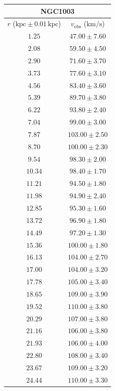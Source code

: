 \documentclass{article}
\newcommand\kpc{\textrm{kpc}}
\newcommand\kmps{\textrm{km}/\textrm{s}}
\newcommand\vobs{\ensuremath{v_{\textrm{obs}}}}
\begin{document}
\begin{table}[h!]
    \begin{tabular}{|c|c|}
        \hline
        \multicolumn{2}{|c|}{NGC1003} \\
        \hline
        $r$ ($\kpc \pm 0.01 \,\kpc$) & $\vobs$ ($\kmps$) \\
        \hline
        $1.25$ & $47.00 \pm 7.60$ \\
        $2.08$ & $59.50 \pm 4.50$ \\
        $2.90$ & $71.60 \pm 3.70$ \\
        $3.73$ & $77.60 \pm 3.10$ \\
        $4.56$ & $83.40 \pm 3.60$ \\
        $5.39$ & $89.70 \pm 3.80$ \\
        $6.22$ & $93.80 \pm 2.40$ \\
        $7.04$ & $99.00 \pm 3.00$ \\
        $7.87$ & $103.00 \pm 2.50$ \\
        $8.70$ & $100.00 \pm 2.30$ \\
        $9.54$ & $98.30 \pm 2.00$ \\
        $10.34$ & $98.40 \pm 1.70$ \\
        $11.21$ & $94.50 \pm 1.80$ \\
        $11.98$ & $94.90 \pm 2.40$ \\
        $12.85$ & $95.30 \pm 1.60$ \\
        $13.72$ & $96.90 \pm 1.80$ \\
        $14.49$ & $97.20 \pm 1.30$ \\
        $15.36$ & $100.00 \pm 1.80$ \\
        $16.13$ & $104.00 \pm 2.70$ \\
        $17.00$ & $104.00 \pm 3.20$ \\
        $17.78$ & $105.00 \pm 3.40$ \\
        $18.65$ & $109.00 \pm 3.90$ \\
        $19.52$ & $110.00 \pm 3.80$ \\
        $20.29$ & $107.00 \pm 3.80$ \\
        $21.16$ & $106.00 \pm 3.80$ \\
        $21.93$ & $106.00 \pm 4.00$ \\
        $22.80$ & $108.00 \pm 3.40$ \\
        $23.67$ & $109.00 \pm 3.20$ \\
        $24.44$ & $110.00 \pm 3.30$ \\

\end{tabular}
\end{table}
\end{document}
